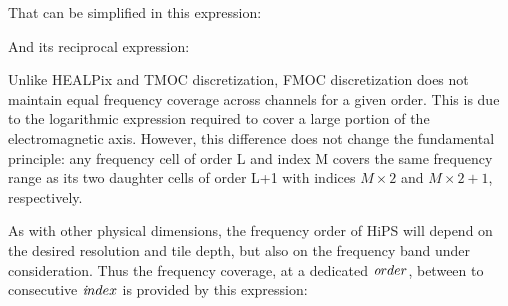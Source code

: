 \documentclass[11pt,a4paper]{ivoa}
\begin{document}
\medskip
\noindent{}
\medskip

That can be simplified in this expression:\\
\medskip
\noindent{}
\medskip

And its reciprocal expression:\\
\medskip
\noindent{}
\medskip


Unlike HEALPix and TMOC discretization, FMOC discretization does not maintain equal frequency coverage across channels for a given order. This is due to the logarithmic expression required to cover a large portion of the electromagnetic axis. However, this difference does not change the fundamental principle: any frequency cell of order L and index M covers the same frequency range as its two daughter cells of order L+1 with indices $M \times 2$ and $M \times 2 +1$, respectively.

As with other physical dimensions, the frequency order of HiPS will depend on the desired resolution and tile depth, but also on the frequency band under consideration. Thus the frequency coverage, at a dedicated ${\textit order}$, between to consecutive ${\textit index}$ is provided by this expression:\\
\medskip
\noindent{}
\medskip
\end{document}
